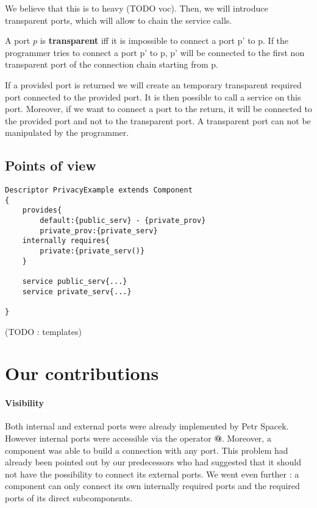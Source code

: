 We believe that this is to heavy (TODO voc). Then, we will introduce transparent ports, which will allow to chain the service calls.

\begin{defi}
A port $p$ is \textbf{transparent} iff it is impossible to connect a port p' to p. If the programmer tries to connect a port p' to p, p' will be connected to the first non transparent port of the connection chain starting from p.
\end{defi}

If a provided port is returned we will create an temporary transparent required port connected to the provided port. It is then possible to call a service on this port. Moreover, if we want to connect a port to the return, it will be connected to the provided port and not to the transparent port. A transparent port can not be manipulated by the programmer.



\subsection{Points of view}

\begin{lstlisting}
Descriptor PrivacyExample extends Component
{
	provides{
		default:{public_serv} - {private_prov}
		private_prov:{private_serv}
	internally requires{
		private:{private_serv()}
	}
	
	service public_serv{...}
	service private_serv{...}
	
}

\end{lstlisting}
(TODO : templates)



\section{Our contributions}
\paragraph{Visibility}
Both internal and external ports were already implemented by Petr Spacek. However internal ports were accessible via the operator \textbf{@}. Moreover, a component was able to build a connection with any port. This problem had already been pointed out by our predecessors who had suggested that it should not have the possibility to connect its external ports. We went even further : a component can only connect its own internally required ports and the required ports of its direct subcomponents.

